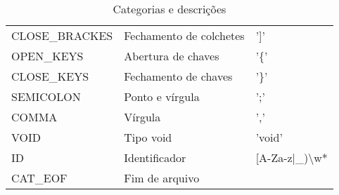 \documentclass[
  12pt,				%
  oneside,			%
  a4paper,			%
  english,			%
  french,				%
  spanish,			%
  brazil,				%
]{abntex2}
\begin{document}
\begin{table}[H]
\begin{tabular}{|l|l|l|}
CLOSE\_BRACKES           & Fechamento de colchetes & ']'\\
OPEN\_KEYS           & Abertura de chaves  & '\{' \\
CLOSE\_KEYS           & Fechamento de chaves & '\}' \\
SEMICOLON           & Ponto e vírgula & ';' \\
COMMA           & Vírgula & ',' \\
VOID & Tipo void & 'void'\\
ID           & Identificador & [A-Za-z|\_)\textbackslash w*\\
CAT\_EOF                    & Fim de arquivo     &        \\ \hline
\end{tabular}
\caption{Categorias e descrições}
\label{tab:cat-desc2}
\end{table}

\postextual


\printindex
\end{document}
